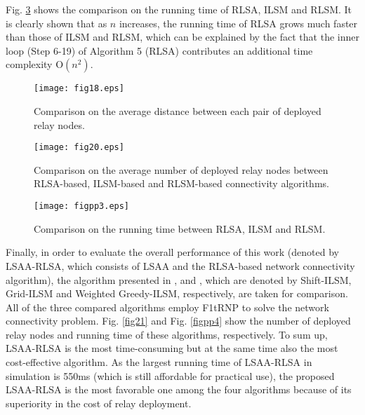 \documentclass[journal]{IEEEtran}
\begin{document}
Fig. \ref{figpp3} shows the comparison on the running time of RLSA, ILSM and RLSM. It is clearly shown that as $n$ increases, the running time of RLSA grows much faster than those of ILSM and RLSM, which can be explained by the fact that the inner loop (Step 6-19) of Algorithm 5 (RLSA) contributes an additional time complexity $\mathrm{O}(n^{2})$.
\begin{figure}
\begin{center}
\texttt{[image: fig18.eps]}    \caption{Comparison on the average distance between each pair of deployed relay nodes.}
\label{fig18}                                 \end{center}                                 \end{figure}



\begin{figure}
\begin{center}
\texttt{[image: fig20.eps]}    \caption{Comparison on the average number of deployed relay nodes between RLSA-based, ILSM-based and RLSM-based connectivity algorithms.}
\label{fig20}                                 \end{center}                                 \end{figure}

\begin{figure}
\begin{center}
\texttt{[image: figpp3.eps]}    \caption{Comparison on the running time between RLSA, ILSM and RLSM.}
\label{figpp3}                                 \end{center}                                 \end{figure}

Finally, in order to evaluate the overall performance of this work (denoted by LSAA-RLSA, which consists of LSAA and the RLSA-based network connectivity algorithm), the algorithm presented in \cite{Tang06}, \cite{Franceschetti01} and \cite{Ali11}, which are denoted by Shift-ILSM,
Grid-ILSM and Weighted Greedy-ILSM, respectively, are taken for comparison. All of the three compared algorithms employ F1tRNP \cite{Lloyd07} to solve the network connectivity problem. Fig. \ref{fig21} and Fig. \ref{figpp4} show the number of deployed relay nodes and running time of these algorithms, respectively. To sum up, LSAA-RLSA is the most time-consuming but at the same time also the most cost-effective algorithm. As the largest running time of LSAA-RLSA in simulation is 550ms (which is still affordable for practical use), the proposed LSAA-RLSA is the most favorable one among the four algorithms because of its superiority in the cost of relay deployment.
\end{document}
